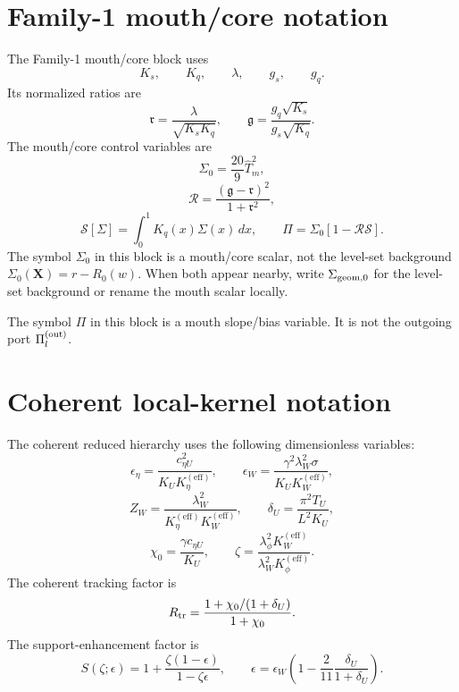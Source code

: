 \section{Family-1 mouth/core notation}
\label{sec:family1-notation}

The Family-1 mouth/core block uses
\begin{equation}
  K_s,
  \qquad
  K_q,
  \qquad
  \lambda,
  \qquad
  g_s,
  \qquad
  g_q.
\end{equation}
Its normalized ratios are
\begin{equation}
  \mathfrak r=\frac{\lambda}{\sqrt{K_sK_q}},
  \qquad
  \mathfrak g=\frac{g_q\sqrt{K_s}}{g_s\sqrt{K_q}}.
\end{equation}
The mouth/core control variables are
\begin{equation}
  \Sigma_0=\frac{20}{9}\widehat T_m^2,
\end{equation}
\begin{equation}
  \mathcal R=\frac{(\mathfrak g-\mathfrak r)^2}{1+\mathfrak r^2},
\end{equation}
\begin{equation}
  \mathcal S[\Sigma]=\int_0^1K_q(x)\Sigma(x)\,dx,
  \qquad
  \Pi=\Sigma_0[1-\mathcal R\mathcal S].
\end{equation}
The symbol \(\Sigma_0\) in this block is a mouth/core scalar, not the level-set background \(\Sigma_0(\mathbf X)=r-R_0(w)\).  When both appear nearby, write \(\Sigma_{\rm geom,0}\) for the level-set background or rename the mouth scalar locally.

The symbol \(\Pi\) in this block is a mouth slope/bias variable.  It is not the outgoing port \(\Pi_l^{\rm(out)}\).

\section{Coherent local-kernel notation}
\label{sec:coherent-kernel-notation}

The coherent reduced hierarchy uses the following dimensionless variables:
\begin{equation}
  \epsilon_\eta=\frac{c_{\eta U}^2}{K_UK_\eta^{(\mathrm{eff})}},
  \qquad
  \epsilon_W=\frac{\gamma^2\lambda_W^2\sigma}{K_UK_W^{(\mathrm{eff})}},
\end{equation}
\begin{equation}
  Z_W=\frac{\lambda_W^2}{K_\eta^{(\mathrm{eff})}K_W^{(\mathrm{eff})}},
  \qquad
  \delta_U=\frac{\pi^2T_U}{L^2K_U},
\end{equation}
\begin{equation}
  \chi_0=\frac{\gamma c_{\eta U}}{K_U},
  \qquad
  \zeta=\frac{\lambda_\phi^2K_W^{(\mathrm{eff})}}{\lambda_W^2K_\phi^{(\mathrm{eff})}}.
\end{equation}
The coherent tracking factor is
\begin{equation}
  R_{\rm tr}=\frac{1+\chi_0/(1+\delta_U)}{1+\chi_0}.
\end{equation}
The support-enhancement factor is
\begin{equation}
  S(\zeta;\epsilon)
  =
  1+\frac{\zeta(1-\epsilon)}{1-\zeta\epsilon},
  \qquad
  \epsilon=\epsilon_W\left(1-\frac{2}{11}\frac{\delta_U}{1+\delta_U}\right).
\end{equation}


